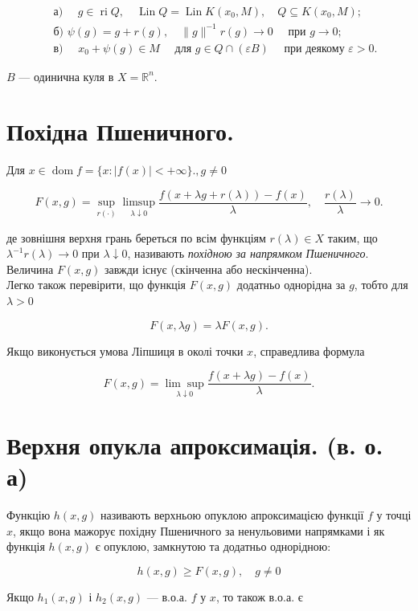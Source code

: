 \documentclass[12pt,a4paper]{extarticle}
\numberwithin{section}{part}
\begin{document}
$$
\begin{aligned}
& \text { а) } \quad g \in \operatorname{ri} Q, \quad \operatorname{Lin} Q=\operatorname{Lin} K\left(x_{0}, M\right), \quad Q \subseteq K\left(x_{0}, M\right) ; \\
& \text { б) } \psi(g)=g+r(g), \quad\|g\|^{-1} r(g) \rightarrow 0 \quad \text { при } g \rightarrow 0 ; \\
& \text { в) } \quad x_{0}+\psi(g) \in M \quad \text { для } g \in Q \cap(\varepsilon B) \quad \text { при деякому } \varepsilon>0 .
\end{aligned}
$$

$B$ --- одинична куля в $X=\mathbb{R}^{n}$.

\section{Похідна Пшеничного.}
Для $x \in \operatorname{dom} f=\{x:|f(x)|<+\infty\} ., g \neq 0$

$$
F(x, g)=\sup _{r(\cdot)} \limsup _{\lambda \downarrow 0} \frac{f(x+\lambda g+r(\lambda))-f(x)}{\lambda}, \quad \frac{r(\lambda)}{\lambda} \rightarrow 0 .
$$

де зовнішня верхня грань береться по всім функціям $r(\lambda) \in X$ таким, що $\lambda^{-1} r(\lambda) \rightarrow 0$ при $\lambda \downarrow 0$, називають \textit{похідною за напрямком Пшеничного}. Величина $F(x, g)$ завжди існує (скінченна або нескінченна).\\
Легко також перевірити, що функція $F(x, g)$ додатньо однорідна за $g$, тобто для $\lambda>0$

$$
F(x, \lambda g)=\lambda F(x, g) .
$$

Якщо виконується умова Ліпшиця в околі точки $x$, справедлива формула

$$
F(x, g)=\underset{\lambda \downarrow 0}{\lim \sup } \frac{f(x+\lambda g)-f(x)}{\lambda} .
$$

\section{Верхня опукла апроксимація. (в. о. а)}
Функцію $h(x, g)$ називають верхньою опуклою апроксимацією функції $f$ у точці $x$, якщо вона мажорує похідну Пшеничного за ненульовими напрямками і як функція $h(x, g)$ є опуклою, замкнутою та додатньо однорідною:

$$
h(x, g) \geq F(x, g), \quad g \neq 0
$$

Якщо $h_{1}(x, g)$ і $h_{2}(x, g)$ --- в.о.а. $f$ у $x$, то також в.о.а. є
\end{document}
